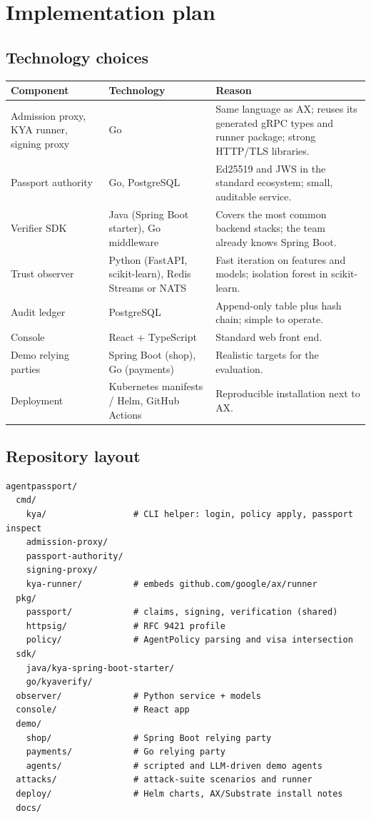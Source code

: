 \section{Implementation plan}\label{sec:plan}

\subsection{Technology choices}

\begin{center}
\small
\begin{tabularx}{\linewidth}{@{}L{3.4cm}L{4.2cm}Y@{}}
\toprule
\textbf{Component} & \textbf{Technology} & \textbf{Reason}\\
\midrule
Admission proxy, KYA runner, signing proxy & Go & Same language as AX; reuses its generated gRPC types and runner package; strong HTTP/TLS libraries.\\
Passport authority & Go, PostgreSQL & Ed25519 and JWS in the standard ecosystem; small, auditable service.\\
Verifier SDK & Java (Spring Boot starter), Go middleware & Covers the most common backend stacks; the team already knows Spring Boot.\\
Trust observer & Python (FastAPI, scikit-learn), Redis Streams or NATS & Fast iteration on features and models; isolation forest in scikit-learn.\\
Audit ledger & PostgreSQL & Append-only table plus hash chain; simple to operate.\\
Console & React + TypeScript & Standard web front end.\\
Demo relying parties & Spring Boot (shop), Go (payments) & Realistic targets for the evaluation.\\
Deployment & Kubernetes manifests / Helm, GitHub Actions & Reproducible installation next to AX.\\
\bottomrule
\end{tabularx}
\end{center}

\subsection{Repository layout}

\begin{lstlisting}[language={}]
agentpassport/
  cmd/
    kya/                 # CLI helper: login, policy apply, passport inspect
    admission-proxy/
    passport-authority/
    signing-proxy/
    kya-runner/          # embeds github.com/google/ax/runner
  pkg/
    passport/            # claims, signing, verification (shared)
    httpsig/             # RFC 9421 profile
    policy/              # AgentPolicy parsing and visa intersection
  sdk/
    java/kya-spring-boot-starter/
    go/kyaverify/
  observer/              # Python service + models
  console/               # React app
  demo/
    shop/                # Spring Boot relying party
    payments/            # Go relying party
    agents/              # scripted and LLM-driven demo agents
  attacks/               # attack-suite scenarios and runner
  deploy/                # Helm charts, AX/Substrate install notes
  docs/
\end{lstlisting}

